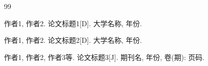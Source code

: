 
\begin{thebibliography}{99}


 作者1, 作者2. 论文标题1[D]. 大学名称, 年份.

 作者1, 作者2. 论文标题2[D]. 大学名称, 年份.

 作者1, 作者2, 作者3等. 论文标题3[J]. 期刊名, 年份, 卷(期): 页码.

\end{thebibliography}

